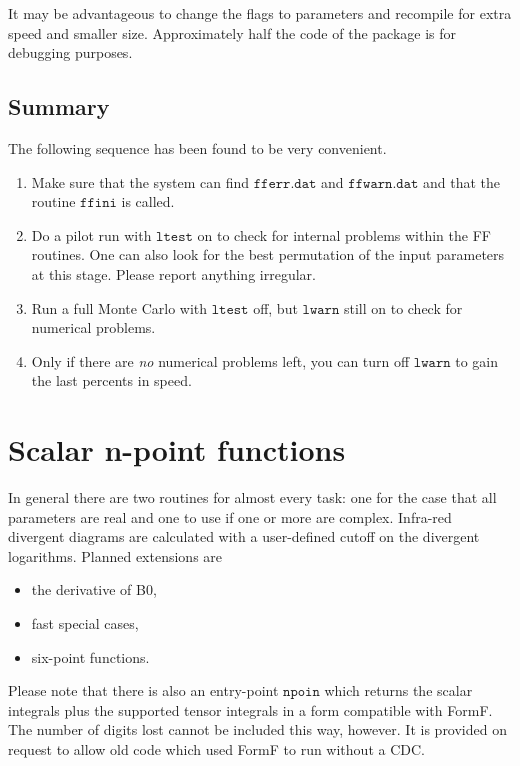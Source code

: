 \documentclass[twoside,12pt]{report}
\def\Code#1{\ensuremath{\texttt{#1}}}
\begin{document}
\begin{appendix}
It may be advantageous to change the flags to parameters and recompile for 
extra speed and smaller size.  Approximately half the code of the package is 
for debugging purposes.

\subsection{Summary}

The following sequence has been found to be very convenient.
\begin{enumerate}
\item Make sure that the system can find \Code{fferr.dat} and \Code{ffwarn.dat} 
and that the routine \Code{ffini} is called.
\item Do a pilot run with \Code{ltest} on to check for internal problems within 
the FF routines.  One can also look for the best permutation of the input 
parameters at this stage.  Please report anything irregular.
\item Run a full Monte Carlo with \Code{ltest} off, but \Code{lwarn} still
on to check for numerical problems.
\item Only if there are {\em no} numerical problems left, you can turn off 
\Code{lwarn} to gain the last percents in speed.
\end{enumerate}

\section{Scalar n-point functions}
\label{sc:n-point}

In general there are two routines for almost every task: one for the case that 
all parameters are real and one to use if one or more are complex.  Infra-red 
divergent diagrams are calculated with a user-defined cutoff on the divergent
logarithms.  Planned extensions are
\begin{itemize}
\item the derivative of B0,
\item fast special cases,
\item six-point functions.
\end{itemize}
Please note that there is also an entry-point \Code{npoin} which returns the 
scalar integrals plus the supported tensor integrals in a form compatible with 
FormF\null.  The number of digits lost cannot be included this way, however.  
It is provided on request to allow old code which used FormF to run without a 
CDC.


\end{appendix}
\end{document}

